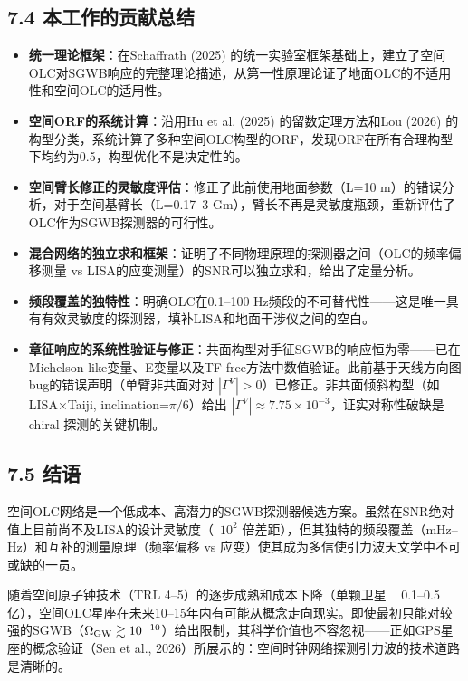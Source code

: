 \documentclass[12pt,a4paper]{article}
\begin{document}
\subsection{7.4 本工作的贡献总结}


\begin{itemize}
  \item[1] \textbf{统一理论框架}：在Schaffrath (2025) 的统一实验室框架基础上，建立了空间OLC对SGWB响应的完整理论描述，从第一性原理论证了地面OLC的不适用性和空间OLC的适用性。

  \item[2] \textbf{空间ORF的系统计算}：沿用Hu et al. (2025) 的留数定理方法和Lou (2026) 的构型分类，系统计算了多种空间OLC构型的ORF，发现ORF在所有合理构型下均约为0.5，构型优化不是决定性的。

  \item[3] \textbf{空间臂长修正的灵敏度评估}：修正了此前使用地面参数（L=10 m）的错误分析，对于空间基臂长（L=0.17–3 Gm），臂长不再是灵敏度瓶颈，重新评估了OLC作为SGWB探测器的可行性。

  \item[4] \textbf{混合网络的独立求和框架}：证明了不同物理原理的探测器之间（OLC的频率偏移测量 vs LISA的应变测量）的SNR可以独立求和，给出了定量分析。

  \item[5] \textbf{频段覆盖的独特性}：明确OLC在0.1–100 Hz频段的不可替代性——这是唯一具有有效灵敏度的探测器，填补LISA和地面干涉仪之间的空白。

  \item[6] \textbf{章征响应的系统性验证与修正}：共面构型对手征SGWB的响应恒为零——已在Michelson-like变量、E变量以及TF-free方法中数值验证。此前基于天线方向图bug的错误声明（单臂非共面对对 $|\Gamma^V|>0$）已修正。非共面倾斜构型（如LISA×Taiji, inclination=$\pi/6$）给出 $|\Gamma^V| \approx 7.75\times 10^{-3}$，证实对称性破缺是 chiral 探测的关键机制。

\end{itemize}
\subsection{7.5 结语}


空间OLC网络是一个低成本、高潜力的SGWB探测器候选方案。虽然在SNR绝对值上目前尚不及LISA的设计灵敏度（~$10^2$ 倍差距），但其独特的频段覆盖（mHz–Hz）和互补的测量原理（频率偏移 vs 应变）使其成为多信使引力波天文学中不可或缺的一员。

随着空间原子钟技术（TRL 4–5）的逐步成熟和成本下降（单颗卫星 ~ 0.1–0.5亿），空间OLC星座在未来10–15年内有可能从概念走向现实。即使最初只能对较强的SGWB（$\Omega_{\rm GW} \gtrsim 10^{-10}$）给出限制，其科学价值也不容忽视——正如GPS星座的概念验证（Sen et al., 2026）所展示的：空间时钟网络探测引力波的技术道路是清晰的。
\end{document}
